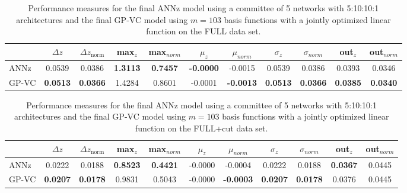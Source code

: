 \documentclass[useAMS,usenatbib,fleqn]{mn2e}
\begin{document}
 \begin{table}
\caption{Performance measures for the final {\sc ANNz} model using a committee of 5 networks with 5:10:10:1 architectures and the final GP-VC model using $m=103$ basis functions with a jointly optimized linear function on the FULL data set.}
\begin{center}
\begin{tabular}{| l | c | c |  c | c |  c | c |  c | c |  c | c | }
     				&	$\Delta z$	&	$\Delta z_\textrm{norm}$	&	max$_{z}$ & max$_{norm}$		&	$\mu_{z}$&	$\mu_{norm}$	& $\sigma_{z}$ & $\sigma_{norm}$ & out$_{z}$&out$_{norm}$\\	\hline
	{\sc ANNz}		&	0.0539	&	0.0386		&	\textbf{1.3113}		&	\textbf{0.7457}&	\textbf{-0.0000}		&	-0.0015 &	0.0539		&	0.0386&	0.0393		&	0.0346\\
	{\sc GP-VC } 	&	\textbf{0.0513} 	&	\textbf{0.0366}		&	1.4284	&	0.8601 & -0.0001		&	\textbf{-0.0013}&	\textbf{0.0513}		&	\textbf{0.0366}&	\textbf{0.0385} 	&	\textbf{0.0340}\\\hline
  \end{tabular}
\end{center}
\label{table-final-results-boss}
\end{table}

 \begin{table}
\caption{Performance measures for the final {\sc ANNz} model using a committee of 5 networks with 5:10:10:1 architectures and the final GP-VC model using $m=103$ basis functions with a jointly optimized linear function on the FULL+cut data set.}
\begin{center}
\begin{tabular}{| l | c | c |  c | c |  c | c |  c | c |  c | c | }
     				&	$\Delta z$	&	$\Delta z_\textrm{norm}$	&	max$_{z}$ & max$_{norm}$		&	$\mu_{z}$&	$\mu_{norm}$	& $\sigma_{z}$ & $\sigma_{norm}$ & out$_{z}$&out$_{norm}$\\	\hline
	{\sc ANNz}		&	0.0222	&	0.0188		&	\textbf{0.8523}		&	\textbf{0.4421}&	-0.0000		&	-0.0004 &	0.0222		&	0.0188&	\textbf{0.0367}		&	0.0445\\
	{\sc GP-VC } 	&	\textbf{0.0207} 	&	\textbf{0.0178}		&	0.9831	&	0.5043 & -0.0000		&	\textbf{-0.0003}&	\textbf{0.0207}		&	\textbf{0.0178}&	0.0376 	&	0.0445\\\hline
  \end{tabular}
\end{center}
\label{table-final-results-boss-cut}
\end{table}
\end{document}
